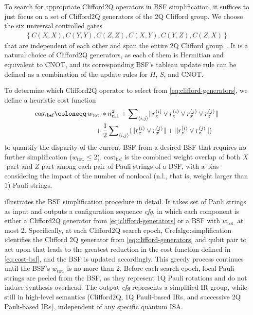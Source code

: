\documentclass[conference,9pt]{IEEEtran}
\newcommand{\CNOT}{\mathrm{CNOT}}
\newcommand{\totalWeight}{w_\mathrm{tot.}}
\begin{document}
    

    To search for appropriate Clifford2Q operators in BSF simplification, it suffices to just focus on a set of Clifford2Q generators of the 2Q Clifford group. We choose the six universal controlled gates
    \begin{align}
        \left\{ C(X,X), C(Y,Y), C(Z,Z), C(X,Y), C(Y,Z), C(Z,X) \right\}\label{eq:clifford-generators}
    \end{align}
    that are independent of each other and span the entire 2Q Clifford group~\cite{grier2022classification}. It is a natural choice of Clifford2Q generators, as each of them is Hermitian and equivalent to $ \CNOT $, and its corresponding BSF's tableau update rule can be defined as a combination of the update rules for $ H $, $ S $, and $ \CNOT $. 

    To determine which Clifford2Q operator to select from \eqref{eq:clifford-generators}, we define a heuristic cost function%
    \begin{align}
        \mathrm{cost}_{\mathrm{bsf}} \coloneqq \, & \totalWeight * n_{\mathrm{n.l.}}^2 \notag + \sum\nolimits_{\langle i,j \rangle} \lVert r_x^{(i)} \lor r_z^{(i)} \lor r_x^{(j)} \lor r_z^{(j)} \rVert  \notag\\
        & \quad + \frac{1}{2} \sum\nolimits_{\langle i,j \rangle} (\lVert r_x^{(i)} \lor r_x^{(j)} \rVert + \lVert r_z^{(i)} \lor r_z^{(j)} \rVert) \label{eq:cost-bsf} 
    \end{align}
    to quantify the disparity of the current BSF from a desired BSF that requires no further simplification ($ \totalWeight \leq 2 $). $ \mathrm{cost}_{\mathrm{bsf}} $ is the combined weight overlap of both $ X $-part and $ Z $-part among each pair of Pauli strings of a BSF, with a bias considering the impact of the number of nonlocal (n.l., that is, weight larger than 1) Pauli strings. %
    
     illustrates the BSF simplification procedure in detail. It takes set of Pauli strings as input and outputs a configuration sequence \textit{cfg}, in which each component is either a Clifford2Q generator from \eqref{eq:clifford-generators} or a BSF with $\totalWeight$ at most 2. Specifically, at each Clifford2Q search epoch, Cref{algo:simplification} identifies the Clifford 2Q generator from \eqref{eq:clifford-generators} and qubit pair to act upon that leads to the greatest reduction in the cost function defined in \eqref{eq:cost-bsf}, and the BSF is updated accordingly. This greedy process continues until the BSF's $ \totalWeight $ is no more than 2. Before each search epoch, local Pauli strings are peeled from the BSF, as they represent 1Q Pauli rotations and do not induce synthesis overhead. The output \textit{cfg} represents a simplified IR group, while still in high-level semantics (Clifford2Q, 1Q Pauli-based IRs, and successive 2Q Pauli-based IRs), independent of any specific quantum ISA.
\end{document}
